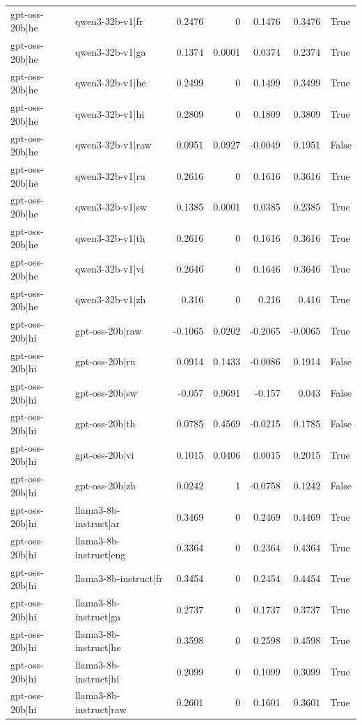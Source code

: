 \begin{table}
\begin{tabular}{l l r r r r l}
gpt-oss-20b|he & qwen3-32b-v1|fr & 0.2476 & 0 & 0.1476 & 0.3476 & True \\
gpt-oss-20b|he & qwen3-32b-v1|ga & 0.1374 & 0.0001 & 0.0374 & 0.2374 & True \\
gpt-oss-20b|he & qwen3-32b-v1|he & 0.2499 & 0 & 0.1499 & 0.3499 & True \\
gpt-oss-20b|he & qwen3-32b-v1|hi & 0.2809 & 0 & 0.1809 & 0.3809 & True \\
gpt-oss-20b|he & qwen3-32b-v1|raw & 0.0951 & 0.0927 & -0.0049 & 0.1951 & False \\
gpt-oss-20b|he & qwen3-32b-v1|ru & 0.2616 & 0 & 0.1616 & 0.3616 & True \\
gpt-oss-20b|he & qwen3-32b-v1|sw & 0.1385 & 0.0001 & 0.0385 & 0.2385 & True \\
gpt-oss-20b|he & qwen3-32b-v1|th & 0.2616 & 0 & 0.1616 & 0.3616 & True \\
gpt-oss-20b|he & qwen3-32b-v1|vi & 0.2646 & 0 & 0.1646 & 0.3646 & True \\
gpt-oss-20b|he & qwen3-32b-v1|zh & 0.316 & 0 & 0.216 & 0.416 & True \\
gpt-oss-20b|hi & gpt-oss-20b|raw & -0.1065 & 0.0202 & -0.2065 & -0.0065 & True \\
gpt-oss-20b|hi & gpt-oss-20b|ru & 0.0914 & 0.1433 & -0.0086 & 0.1914 & False \\
gpt-oss-20b|hi & gpt-oss-20b|sw & -0.057 & 0.9691 & -0.157 & 0.043 & False \\
gpt-oss-20b|hi & gpt-oss-20b|th & 0.0785 & 0.4569 & -0.0215 & 0.1785 & False \\
gpt-oss-20b|hi & gpt-oss-20b|vi & 0.1015 & 0.0406 & 0.0015 & 0.2015 & True \\
gpt-oss-20b|hi & gpt-oss-20b|zh & 0.0242 & 1 & -0.0758 & 0.1242 & False \\
gpt-oss-20b|hi & llama3-8b-instruct|ar & 0.3469 & 0 & 0.2469 & 0.4469 & True \\
gpt-oss-20b|hi & llama3-8b-instruct|eng & 0.3364 & 0 & 0.2364 & 0.4364 & True \\
gpt-oss-20b|hi & llama3-8b-instruct|fr & 0.3454 & 0 & 0.2454 & 0.4454 & True \\
gpt-oss-20b|hi & llama3-8b-instruct|ga & 0.2737 & 0 & 0.1737 & 0.3737 & True \\
gpt-oss-20b|hi & llama3-8b-instruct|he & 0.3598 & 0 & 0.2598 & 0.4598 & True \\
gpt-oss-20b|hi & llama3-8b-instruct|hi & 0.2099 & 0 & 0.1099 & 0.3099 & True \\
gpt-oss-20b|hi & llama3-8b-instruct|raw & 0.2601 & 0 & 0.1601 & 0.3601 & True \\

\end{tabular}
\end{table}
